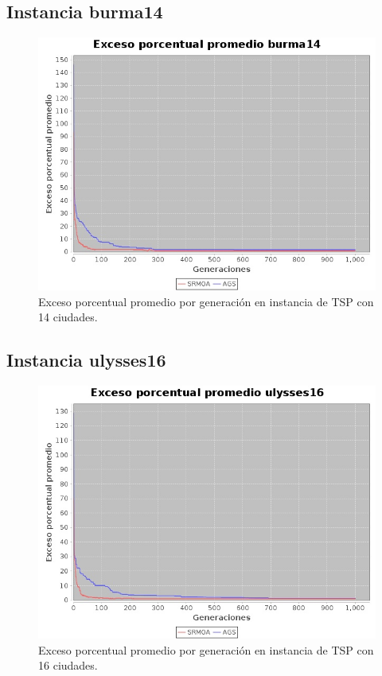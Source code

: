 \documentclass[12pt]{article}
\begin{document}
\subsection{Instancia burma14}
\begin{figure}[H]
  \centering
  \includegraphics[width=1\textwidth]{graficas/burma14}
  \caption{Exceso porcentual promedio por generación en instancia de TSP con 14 ciudades.}
\end{figure}
\subsection{Instancia ulysses16}
\begin{figure}[H]
  \centering
  \includegraphics[width=1\textwidth]{graficas/ulysses16}
  \caption{Exceso porcentual promedio por generación en instancia de TSP con 16 ciudades.}
\end{figure}
\end{document}
